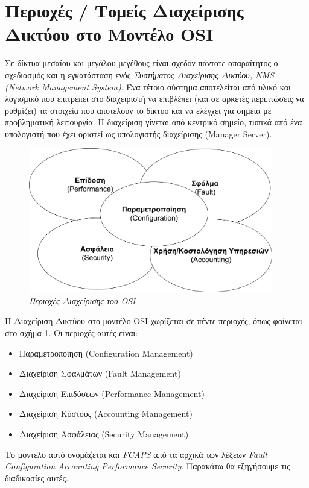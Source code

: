 %
%
\setcounter{section}{1}
\section{Περιοχές / Τομείς Διαχείρισης Δικτύου στο Μοντέλο OSI}

Σε δίκτυα μεσαίου και μεγάλου μεγέθους είναι σχεδόν πάντοτε απαραίτητος ο σχεδιασμός και η εγκατάσταση ενός \emph{Συστήματος Διαχείρισης Δικτύου, NMS (Network Management System)}. Ένα τέτοιο σύστημα αποτελείται από υλικό και λογισμικό που επιτρέπει στο διαχειριστή να επιβλέπει (και σε αρκετές περιπτώσεις να ρυθμίζει) τα στοιχεία που αποτελούν το δίκτυο και να ελέγχει για σημεία με προβληματική λειτουργία. Η διαχείριση γίνεται από κεντρικό σημείο, τυπικά από ένα υπολογιστή που έχει οριστεί ως υπολογιστής διαχείρισης (Manager Server).

\begin{figure}[!ht]
 \centering
 \includegraphics[width=0.95\textwidth]{images/chapter7/7-1}
 \caption {\textsl{Περιοχές Διαχείρισης του OSI}}
 \label{7-1}
\end{figure}

Η Διαχείριση Δικτύου στο μοντέλο OSI χωρίζεται σε πέντε περιοχές, όπως φαίνεται στο σχήμα \ref{7-1}.  Οι περιοχές αυτές είναι:

\begin{itemize}
\item Παραμετροποίηση (Configuration Management)
\item Διαχείριση Σφαλμάτων (Fault Management)
\item Διαχείριση Επιδόσεων (Performance Management)
\item Διαχείριση Κόστους (Accounting Management)
\item Διαχείριση Ασφάλειας (Security Management)
\end{itemize}

Το μοντέλο αυτό ονομάζεται και \emph{FCAPS} από τα αρχικά των λέξεων \emph{Fault Con\-fig\-u\-ra\-tion Accounting Performance Security}. Παρακάτω θα εξηγήσουμε τις διαδικασίες αυτές.